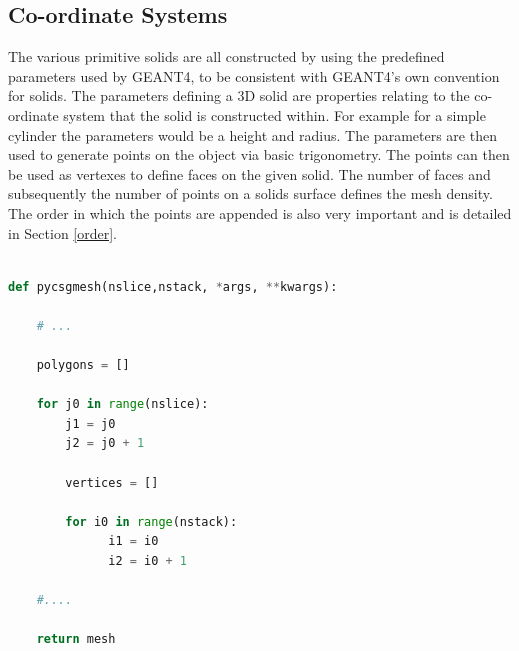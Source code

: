 \documentclass[12pt,a4paper]{article}
\begin{document}
\subsection{Co-ordinate Systems}
\label{cosy}
The various primitive solids are all constructed by using the predefined parameters used by GEANT4, to be consistent with GEANT4's own convention for solids. The parameters defining a 3D solid are properties relating to the co-ordinate system that the solid is constructed within. For example for a simple cylinder the parameters would be a height and radius. The parameters are then used to generate points on the object via basic trigonometry. The points can then be used as vertexes to define faces on the given solid. The number of faces and subsequently the number of points on a solids surface defines the mesh density. The order in which the points are appended is also very important and is detailed in Section \ref{order}.
\\\\

\begin{lstlisting}[language=python, label=code1, caption=Basic python function structure for new meshing of primitive solid in Pyg4ometry.]
def pycsgmesh(nslice,nstack, *args, **kwargs):

    # ... 
    
    polygons = []

    for j0 in range(nslice):
        j1 = j0
        j2 = j0 + 1
    
        vertices = []

        for i0 in range(nstack):
              i1 = i0
              i2 = i0 + 1     
              
    #....
    
    return mesh

\end{lstlisting}
\end{document}
